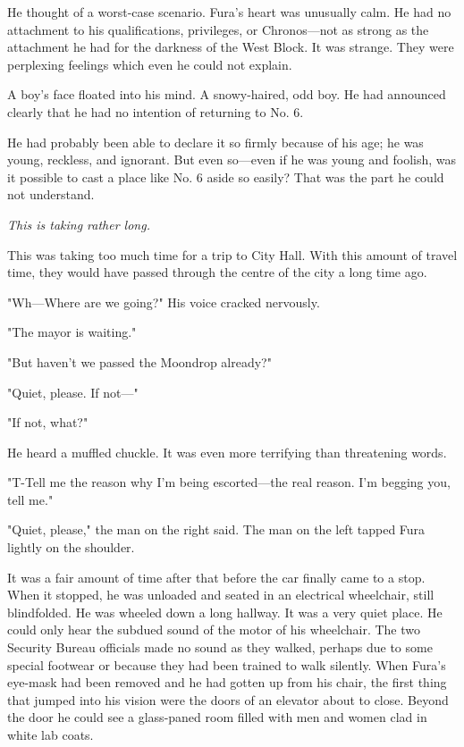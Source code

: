 He thought of a worst-case scenario. Fura's heart was unusually calm. He
had no attachment to his qualifications, privileges, or Chronos---not as
strong as the attachment he had for the darkness of the West Block. It
was strange. They were perplexing feelings which even he could not
explain.

A boy's face floated into his mind. A snowy-haired, odd boy. He had
announced clearly that he had no intention of returning to No. 6.

He had probably been able to declare it so firmly because of his age; he
was young, reckless, and ignorant. But even so---even if he was young and
foolish, was it possible to cast a place like No. 6 aside so easily?
That was the part he could not understand.

\emph{This is taking rather long.}

This was taking too much time for a trip to City Hall. With this amount
of travel time, they would have passed through the centre of the city a
long time ago.

"Wh---Where are we going?" His voice cracked nervously.

"The mayor is waiting."

"But haven't we passed the Moondrop already?"

"Quiet, please. If not---"

"If not, what?"

He heard a muffled chuckle. It was even more terrifying than threatening
words.

"T-Tell me the reason why I'm being escorted---the real reason. I'm
begging you, tell me."

"Quiet, please," the man on the right said. The man on the left tapped
Fura lightly on the shoulder.

It was a fair amount of time after that before the car finally came to a
stop. When it stopped, he was unloaded and seated in an electrical
wheelchair, still blindfolded. He was wheeled down a long hallway. It
was a very quiet place. He could only hear the subdued sound of the
motor of his wheelchair. The two Security Bureau officials made no sound
as they walked, perhaps due to some special footwear or because they had
been trained to walk silently. When Fura's eye-mask had been removed and
he had gotten up from his chair, the first thing that jumped into his
vision were the doors of an elevator about to close. Beyond the door he
could see a glass-paned room filled with men and women clad in white lab
coats.

